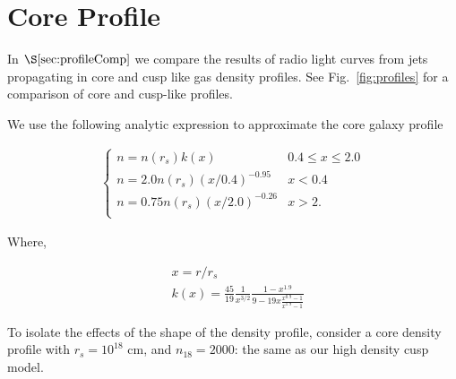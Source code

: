 \documentclass[usenatbib,fleqn]{mnras}
\begin{document}
\appendix
\section{Core Profile}
\label{app:core}
In $\S\ref{sec:profileComp}$ we compare the results of radio
light curves from jets propagating in core and cusp like gas density
profiles. See Fig.~\ref{fig:profiles} for a comparison of core and
cusp-like profiles. 

We use the following analytic expression to approximate the core
galaxy profile

\begin{align}
\begin{cases}
n=n(r_s) k(x) & 0.4 \leq x\leq 2.0\\
n = 2.0 n(r_s) (x/0.4)^{-0.95} & x < 0.4\\
n = 0.75 n(r_s) (x/2.0)^{-0.26} & x>2.\\
\end{cases}
\label{eq:cores}
\end{align}

Where, 

\begin{align}
  &x=r/r_s\\\nonumber
  &k(x)=\frac{45}{19} \frac{1}{x^{3/2}} \frac{1-x^{1.9}}{9-19
      x\frac{x^{0.9}-1}{x^{1.9}-1}}
\end{align}

To isolate the effects of the shape of the density profile, consider a
core density profile with $r_s=10^{18}$ cm, and $n_{18}=2000$: the
same as our high density cusp model.

\clearpage



\clearpage
  \footnotesize{
    
    
  }
\end{document}
